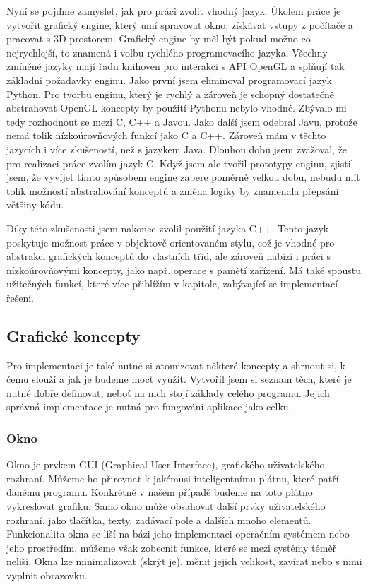 \documentclass[12pt]{article}
\begin{document}
Nyní se pojďme zamyslet, jak pro práci zvolit vhodný jazyk. Úkolem práce je vytvořit grafický engine, který umí spravovat okno, získávat vstupy z počítače a pracovat s 3D prostorem. Grafický engine by měl být pokud možno co nejrychlejší, to znamená i volbu rychlého programovacího jazyka. Všechny zmíněné jazyky mají řadu knihoven pro interakci s API OpenGL a splňují tak základní požadavky enginu. Jako první jsem eliminoval programovací jazyk Python. Pro tvorbu enginu, který je rychlý a zároveň je schopný dostatečně abstrahovat OpenGL koncepty by použití Pythonu nebylo vhodné. Zbývalo mi tedy rozhodnout se mezi C, C++ a Javou. Jako další jsem odebral Javu, protože nemá tolik nízkoúrovňových funkcí jako C a C++. Zároveň mám v těchto jazycích i více zkušeností, než s jazykem Java. Dlouhou dobu jsem zvažoval, že pro realizaci práce zvolím jazyk C. Když jsem ale tvořil prototypy enginu, zjistil jsem, že vyvíjet tímto způsobem engine zabere poměrně velkou dobu, nebudu mít tolik možností abstrahování konceptů a změna logiky by znamenala přepsání většiny kódu.

Díky této zkušenosti jsem nakonec zvolil použití jazyka C++. Tento jazyk poskytuje možnost práce v objektově orientovaném stylu, což je vhodné pro abstrakci grafických konceptů do vlastních tříd, ale zároveň nabízí i práci s nízkoúrovňovými koncepty, jako např. operace s pamětí zařízení. Má také spoustu užitečných funkcí, které více přiblížím v kapitole, zabývající se implementací řešení.

\subsection{Grafické koncepty}

Pro implementaci je také nutné si atomizovat některé koncepty a shrnout si, k čemu slouží a jak je budeme moct využít. Vytvořil jsem si seznam těch, které je nutné dobře definovat, neboť na nich stojí základy celého programu. Jejich správná implementace je nutná pro fungování aplikace jako celku.

\subsubsection{Okno} \label{okno}

Okno je prvkem GUI (Graphical User Interface)\cite{gui}, grafického uživatelského rozhraní. Můžeme ho přirovnat k jakémusi inteligentnímu plátnu, které patří danému programu. Konkrétně v našem případě budeme na toto plátno vykreslovat grafiku. Samo okno může obsahovat další prvky uživatelského rozhraní, jako tlačítka, texty, zadávací pole a dalších mnoho elementů. Funkcionalita okna se liší na bázi jeho implementaci operačním systémem nebo jeho prostředím, můžeme však zobecnit funkce, které se mezi systémy téměř neliší. Okna lze minimalizovat (skrýt je), měnit jejich velikost, zavírat nebo s nimi vyplnit obrazovku. \cite{window}
\end{document}
